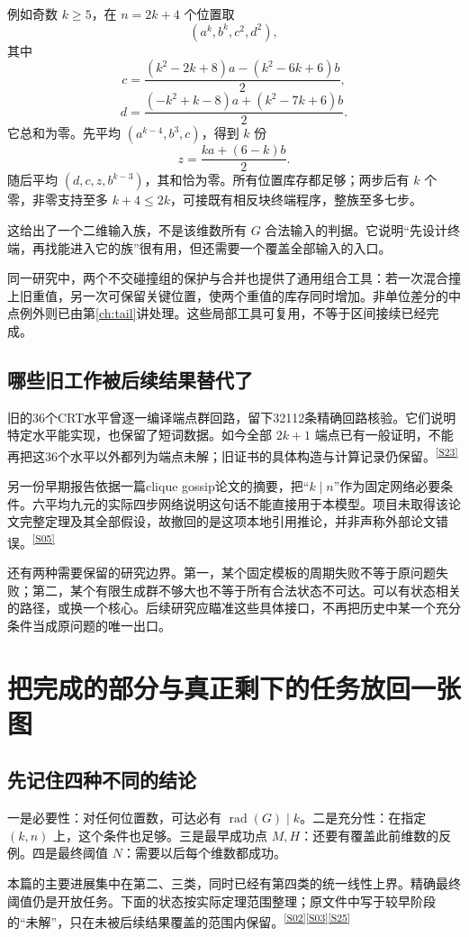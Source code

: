 \documentclass[11pt,a4paper,oneside,openany]{book}
\newcommand{\rad}{\operatorname{rad}}\newcommand{\diag}{\operatorname{diag}}
\newcommand{\src}[1]{\textsuperscript{\hyperref[source:#1]{[#1]}}}
\theoremstyle{definition}\newtheorem{example}[theorem]{例}\newtheorem{conjecture}[theorem]{猜想}
\numberwithin{equation}{chapter}\setcounter{tocdepth}{1}
\begin{document}
例如奇数 $k\ge5$，在 $n=2k+4$ 个位置取
\[(a^k,b^k,c^2,d^2),
\]
其中
\[
c=\frac{(k^2-2k+8)a-(k^2-6k+6)b}{2},
\]
\[
d=\frac{(-k^2+k-8)a+(k^2-7k+6)b}{2}.
\]
它总和为零。先平均 $(a^{k-4},b^3,c)$，得到 $k$ 份
\[z=\frac{ka+(6-k)b}{2}.
\]
随后平均 $(d,c,z,b^{k-3})$，其和恰为零。所有位置库存都足够；两步后有 $k$ 个零，非零支持至多 $k+4\le2k$，可接既有相反块终端程序，整族至多七步。

这给出了一个二维输入族，不是该维数所有 $G$ 合法输入的判据。它说明“先设计终端，再找能进入它的族”很有用，但还需要一个覆盖全部输入的入口。

同一研究中，两个不交碰撞组的保护与合并也提供了通用组合工具：若一次混合撞上旧重值，另一次可保留关键位置，使两个重值的库存同时增加。非单位差分的中点例外则已由第\ref{ch:tail}讲处理。这些局部工具可复用，不等于区间接续已经完成。

\section{哪些旧工作被后续结果替代了}
旧的36个CRT水平曾逐一编译端点群回路，留下32112条精确回路核验。它们说明特定水平能实现，也保留了短词数据。如今全部 $2k+1$ 端点已有一般证明，不能再把这36个水平以外都列为端点未解；旧证书的具体构造与计算记录仍保留。\src{S23}

另一份早期报告依据一篇clique gossip论文的摘要，把“$k\mid n$”作为固定网络必要条件。六平均九元的实际四步网络说明这句话不能直接用于本模型。项目未取得该论文完整定理及其全部假设，故撤回的是这项本地引用推论，并非声称外部论文错误。\src{S05}

还有两种需要保留的研究边界。第一，某个固定模板的周期失败不等于原问题失败；第二，某个有限生成群不够大也不等于所有合法状态不可达。可以有状态相关的路径，或换一个核心。后续研究应瞄准这些具体接口，不再把历史中某一个充分条件当成原问题的唯一出口。


\chapter{把完成的部分与真正剩下的任务放回一张图}\label{ch:map}
\section{先记住四种不同的结论}
一是必要性：对任何位置数，可达必有 $\rad(G)\mid k$。二是充分性：在指定 $(k,n)$ 上，这个条件也足够。三是最早成功点 $M,H$：还要有覆盖此前维数的反例。四是最终阈值 $N$：需要以后每个维数都成功。

本篇的主要进展集中在第二、三类，同时已经有第四类的统一线性上界。精确最终阈值仍是开放任务。下面的状态按实际定理范围整理；原文件中写于较早阶段的“未解”，只在未被后续结果覆盖的范围内保留。\src{S02}\src{S03}\src{S25}
\end{document}
